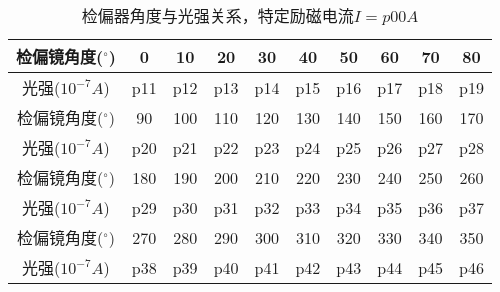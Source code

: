 \newpage
\begin{table}[H]
    \centering
    \begin{tabular}{|c|c|c|c|c|c|c|c|c|c|}
        \hline
        检偏镜角度(${}^{\circ}$)  & 0   & 10  & 20  & 30  & 40  & 50  & 60  & 70  & 80  \\\hline
        光强($10^{-7} \si{A}$) & p11 & p12 & p13 & p14 & p15 & p16 & p17 & p18 & p19 \\\hline
        检偏镜角度(${}^{\circ}$)  & 90  & 100 & 110 & 120 & 130 & 140 & 150 & 160 & 170 \\\hline
        光强($10^{-7} \si{A}$) & p20 & p21 & p22 & p23 & p24 & p25 & p26 & p27 & p28 \\\hline
        检偏镜角度(${}^{\circ}$)  & 180 & 190 & 200 & 210 & 220 & 230 & 240 & 250 & 260 \\\hline
        光强($10^{-7} \si{A}$) & p29 & p30 & p31 & p32 & p33 & p34 & p35 & p36 & p37 \\\hline
        检偏镜角度(${}^{\circ}$)  & 270 & 280 & 290 & 300 & 310 & 320 & 330 & 340 & 350 \\\hline
        光强($10^{-7} \si{A}$) & p38 & p39 & p40 & p41 & p42 & p43 & p44 & p45 & p46 \\\hline
    \end{tabular}
    \caption{检偏器角度与光强关系，特定励磁电流$I=p00 \si{A}$}
\end{table}
